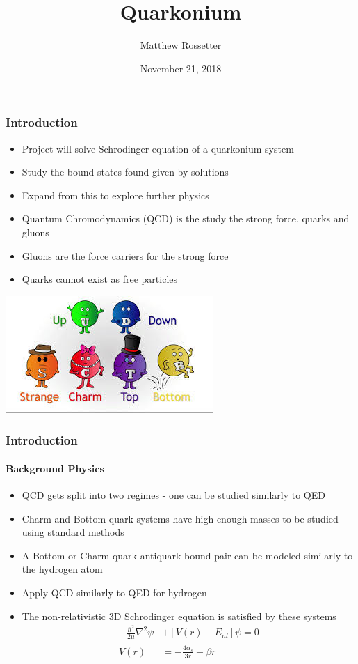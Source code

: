 \documentclass[mathserif, 10pt,usenames,dvipsnames]{beamer}
\title{Quarkonium}
\author{Matthew Rossetter}
\institute{
    Durham University
}
\date{November 21, 2018}
\begin{document}

\begin{frame}
    \frametitle{Introduction}
    \begin{itemize}
        \item Project will solve Schrodinger equation of a quarkonium system
        \item Study the bound states found given by solutions
        \item Expand from this to explore further physics
        \item Quantum Chromodynamics (QCD) is the study the strong force, quarks and gluons
        \item Gluons are the force carriers for the strong force
        \item Quarks cannot exist as free particles
    \end{itemize}
    \begin{center}
        \includegraphics[scale=0.5]{quarks.jpg}
    \end{center}
\end{frame}

\begin{frame}
    \frametitle{Introduction}
    \framesubtitle{Background Physics}
    \begin{itemize}
        \item QCD gets split into two regimes - one can be studied similarly to QED
        \item Charm and Bottom quark systems have high enough masses to be studied using standard methods
        \item A Bottom or Charm quark-antiquark bound pair can be modeled similarly to the hydrogen atom
        \item Apply QCD similarly to QED for hydrogen
        \item The non-relativistic 3D Schrodinger equation is satisfied by these systems
            \begin{align}
                -\frac{\hbar^2}{2\mu}\nabla^2\psi &+ \left[V(r) - E_{nl}\right]\psi = 0 \\
                V(r) &= -\frac{4\alpha_s}{3r} + \beta r
            \end{align}
    \end{itemize}
\end{frame}
\end{document}
